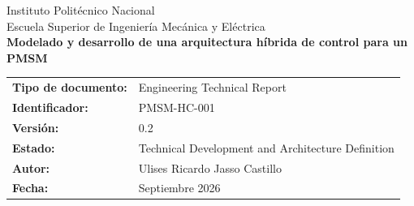 \documentclass[12pt,letterpaper]{article}
\newcommand{\DocumentTitle}{Modelado y desarrollo de una arquitectura híbrida de control para un PMSM}
\newcommand{\DocumentType}{Engineering Technical Report}
\newcommand{\DocumentID}{PMSM-HC-001}
\newcommand{\DocumentVersion}{0.2}
\newcommand{\DocumentStatus}{Technical Development and Architecture Definition}
\newcommand{\DocumentAuthor}{Ulises Ricardo Jasso Castillo}
\newcommand{\DocumentDate}{Septiembre 2026}
\begin{document}
\begin{titlepage}
\centering
\vspace*{2cm}
{\Large Instituto Politécnico Nacional\\[0.4cm]}
{\large Escuela Superior de Ingeniería Mecánica y Eléctrica\\[1.5cm]}
{\Large \textbf{\DocumentTitle}\\[1cm]}
\begin{tabular}{>{\bfseries}p{}p{}}
Tipo de documento: & \DocumentType \\
Identificador: & \DocumentID \\
Versión: & \DocumentVersion \\
Estado: & \DocumentStatus \\
Autor: & \DocumentAuthor \\
Fecha: & \DocumentDate \\
\end{tabular}
\vfill
\end{titlepage}

\tableofcontents
\newpage
\listoffigures
\newpage
\listoftables
\newpage













\appendix
\end{document}
